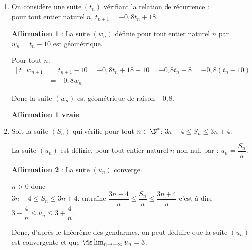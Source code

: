 \smallskip



\begin{enumerate}
\item On considère une suite $\left(t_n\right)$ vérifiant la relation de récurrence : \\
pour tout entier naturel $n$, $t_{n+1}= - 0,8t_n + 18.$

	\textbf{Affirmation 1} : La suite $\left(w_n\right)$ définie pour tout entier naturel $n$ par $w_n = t_n - 10$ est géométrique.

\smallskip
	
Pour tout $n$: 
$\begin{aligned}[t]
w_{n  +1} & =t_{n+1}-10 = -0,8 t_n +18 - 10 = -0,8t_n +8 = -0,8\left ( t_n-10\right)\\
&  = -0,8 w_n
\end{aligned}$

Donc la suite $(w_n)$ est géométrique de raison $-0,8$.
	
\hfill{\blue\bf Affirmation 1 vraie}	
	
\item Soit la suite $\left(S_n\right)$ qui vérifie pour tout $n\in \N^*$: $3n - 4 \leqslant S_n \leqslant 3n + 4.$

	La suite $\left(u_n\right)$ est définie, pour tout entier naturel $n$ non nul, par : $u_n=\dfrac{S_n}{n}$.
	
	\textbf{Affirmation 2} : La suite $\left(u_n\right)$ converge.
	
	\smallskip

$n>0$ donc \\
$3n - 4 \leqslant S_n \leqslant 3n + 4.$ entraîne $\dfrac{3n - 4}{n} \leqslant \dfrac{S_n}{n} \leqslant \dfrac{3n + 4}{n}$ c'est-à-dire
$3-\dfrac{4}{n} \leqslant u_n \leqslant 3+\dfrac{4}{n}$.


Donc, d'après le théorème des gendarmes, on peut déduire que la suite $(u_n)$ est convergente et que $\ds\lim_{n\to +\infty} u_n=3$.


\end{enumerate}
